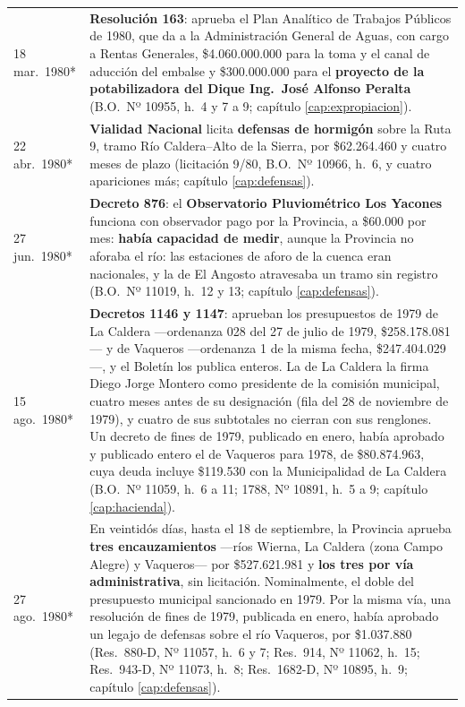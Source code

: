 \begin{longtable}{@{}p{2.7cm}p{10.3cm}@{}}
18 mar.\ 1980* & \textbf{Resolución 163}: aprueba el Plan Analítico de Trabajos Públicos de 1980, que da a la Administración General de Aguas, con cargo a Rentas Generales, \$4.060.000.000 para la toma y el canal de aducción del embalse y \$300.000.000 para el \textbf{proyecto de la potabilizadora del Dique Ing.\ José Alfonso Peralta} (B.O.\ Nº 10955, h.\ 4 y 7 a 9; capítulo \ref{cap:expropiacion}). \\
22 abr.\ 1980* & \textbf{Vialidad Nacional} licita \textbf{defensas de hormigón} sobre la Ruta 9, tramo Río Caldera--Alto de la Sierra, por \$62.264.460 y cuatro meses de plazo (licitación 9/80, B.O.\ Nº 10966, h.\ 6, y cuatro apariciones más; capítulo \ref{cap:defensas}). \\
27 jun.\ 1980* & \textbf{Decreto 876}: el \textbf{Observatorio Pluviométrico Los Yacones} funciona con observador pago por la Provincia, a \$60.000 por mes: \textbf{había capacidad de medir}, aunque la Provincia no aforaba el río: las estaciones de aforo de la cuenca eran nacionales, y la de El Angosto atravesaba un tramo sin registro (B.O.\ Nº 11019, h.\ 12 y 13; capítulo \ref{cap:defensas}). \\
15 ago.\ 1980* & \textbf{Decretos 1146 y 1147}: aprueban los presupuestos de 1979 de La Caldera ---ordenanza 028 del 27 de julio de 1979, \$258.178.081--- y de Vaqueros ---ordenanza 1 de la misma fecha, \$247.404.029---, y el Boletín los publica enteros. La de La Caldera la firma Diego Jorge Montero como presidente de la comisión municipal, cuatro meses antes de su designación (fila del 28 de noviembre de 1979), y cuatro de sus subtotales no cierran con sus renglones. Un decreto de fines de 1979, publicado en enero, había aprobado y publicado entero el de Vaqueros para 1978, de \$80.874.963, cuya deuda incluye \$119.530 con la Municipalidad de La Caldera (B.O.\ Nº 11059, h.\ 6 a 11; 1788, Nº 10891, h.\ 5 a 9; capítulo \ref{cap:hacienda}). \\
27 ago.\ 1980* & En veintidós días, hasta el 18 de septiembre, la Provincia aprueba \textbf{tres encauzamientos} ---ríos Wierna, La Caldera (zona Campo Alegre) y Vaqueros--- por \$527.621.981 y \textbf{los tres por vía administrativa}, sin licitación. Nominalmente, el doble del presupuesto municipal sancionado en 1979. Por la misma vía, una resolución de fines de 1979, publicada en enero, había aprobado un legajo de defensas sobre el río Vaqueros, por \$1.037.880 (Res.\ 880-D, Nº 11057, h.\ 6 y 7; Res.\ 914, Nº 11062, h.\ 15; Res.\ 943-D, Nº 11073, h.\ 8; Res.\ 1682-D, Nº 10895, h.\ 9; capítulo \ref{cap:defensas}). \\

\end{longtable}
